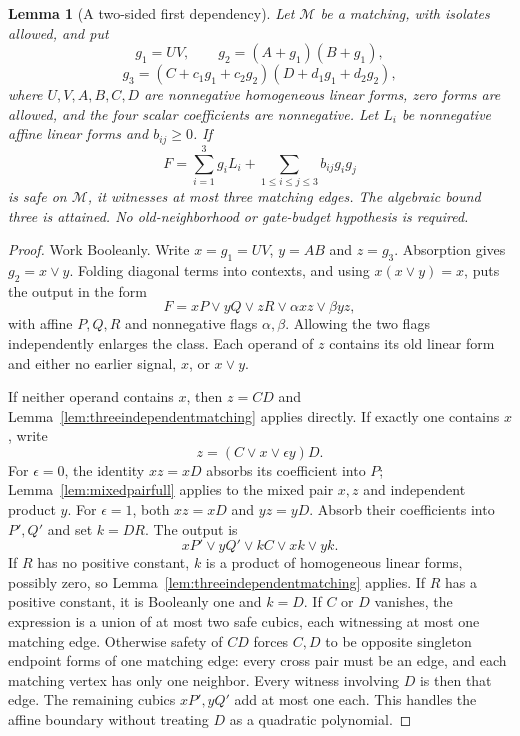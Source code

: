 \documentclass[11pt]{article}
\newtheorem{lemma}[theorem]{Lemma}
\theoremstyle{definition}
\theoremstyle{remark}
\begin{document}
\begin{lemma}[A two-sided first dependency]\label{lem:twosidedfirst}
Let $\mathcal M$ be a matching, with isolates allowed, and put
\[
 g_1=UV,\qquad g_2=(A+g_1)(B+g_1),
\]
\[
 g_3=(C+c_1g_1+c_2g_2)(D+d_1g_1+d_2g_2),
\]
where $U,V,A,B,C,D$ are nonnegative homogeneous linear forms, zero forms are allowed, and the four scalar coefficients are nonnegative. Let $L_i$ be nonnegative affine linear forms and $b_{ij}\ge0$. If
\[
 F=\sum_{i=1}^3g_iL_i+\sum_{1\le i\le j\le3}b_{ij}g_ig_j
\]
is safe on $\mathcal M$, it witnesses at most three matching edges. The algebraic bound three is attained. No old-neighborhood or gate-budget hypothesis is required.
\end{lemma}
\begin{proof}
Work Booleanly. Write $x=g_1=UV$, $y=AB$ and $z=g_3$. Absorption gives $g_2=x\vee y$. Folding diagonal terms into contexts, and using $x(x\vee y)=x$, puts the output in the form
\[
 F=xP\vee yQ\vee zR\vee\alpha xz\vee\beta yz,
\]
with affine $P,Q,R$ and nonnegative flags $\alpha,\beta$. Allowing the two flags independently enlarges the class. Each operand of $z$ contains its old linear form and either no earlier signal, $x$, or $x\vee y$.

If neither operand contains $x$, then $z=CD$ and Lemma~\ref{lem:threeindependentmatching} applies directly. If exactly one contains $x$, write
\[
 z=(C\vee x\vee\epsilon y)D.
\]
For $\epsilon=0$, the identity $xz=xD$ absorbs its coefficient into $P$; Lemma~\ref{lem:mixedpairfull} applies to the mixed pair $x,z$ and independent product $y$. For $\epsilon=1$, both $xz=xD$ and $yz=yD$. Absorb their coefficients into $P',Q'$ and set $k=DR$. The output is
\[
 xP'\vee yQ'\vee kC\vee xk\vee yk.
\]
If $R$ has no positive constant, $k$ is a product of homogeneous linear forms, possibly zero, so Lemma~\ref{lem:threeindependentmatching} applies. If $R$ has a positive constant, it is Booleanly one and $k=D$. If $C$ or $D$ vanishes, the expression is a union of at most two safe cubics, each witnessing at most one matching edge. Otherwise safety of $CD$ forces $C,D$ to be opposite singleton endpoint forms of one matching edge: every cross pair must be an edge, and each matching vertex has only one neighbor. Every witness involving $D$ is then that edge. The remaining cubics $xP',yQ'$ add at most one each. This handles the affine boundary without treating $D$ as a quadratic polynomial.


\end{proof}
\end{document}
